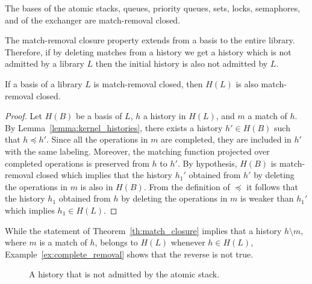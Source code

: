 
\begin{theorem}

The bases of the atomic stacks, queues, priority queues, sets, locks, semaphores, and of the
exchanger are match-removal closed.

\end{theorem}

The match-removal closure property extends from a basis to the entire library.
Therefore, if by deleting matches from a history we get a history which is not admitted
by a library $L$ then the initial history is also not admitted by $L$.

\begin{theorem}\label{th:match_closure}

If a basis of a library $L$ is match-removal closed, then $H(L)$ is also match-removal closed.

\end{theorem}

\begin{proof}

Let $H(B)$ be a basis of $L$, $h$ a history in $H(L)$, and $m$
a match of $h$.
By Lemma~\ref{lemma:kernel_histories}, %
there exists a history $h'\in H(B)$ such that $h\preceq h'$. 
Since all the operations in $m$ are completed, they are included in $h'$ with the
same labeling. Moreover, the matching function projected over completed
operations is preserved from $h$ to $h'$. 
By hypothesis, $H(B)$ is match-removal closed which implies 
that the history $h_1'$ obtained from $h'$ by deleting the operations in $m$ 
is also in $H(B)$. From the definition of $\preceq$ it follows that
the history $h_1$ obtained from $h$ by deleting the operations in $m$ 
is weaker than $h_1'$ which implies $h_1\in H(L)$.
\end{proof}

While the statement of Theorem~\ref{th:match_closure} implies that a history
$h\setminus m$, where $m$ is a match of $h$, belongs to $H(L)$ whenever $h\in H(L)$,
Example~\ref{ex:complete_removal} shows that the reverse is not true. 

\begin{figure}



\caption{A history that is not admitted by the atomic stack.}
\label{fig:complete_removal}

\end{figure}

